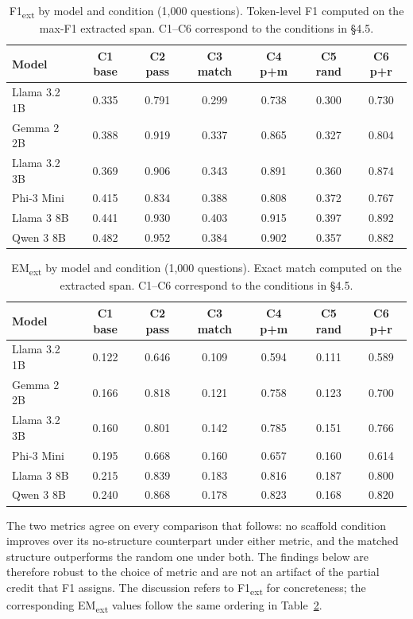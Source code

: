 \documentclass{article}
\begin{document}
\begin{table}[h]
\centering
\begin{tabular}{lcccccc}
\toprule
Model & C1 base & C2 pass & C3 match & C4 p+m & C5 rand & C6 p+r \\
\midrule
Llama 3.2 1B & 0.335 & 0.791 & 0.299 & 0.738 & 0.300 & 0.730 \\
Gemma 2 2B   & 0.388 & 0.919 & 0.337 & 0.865 & 0.327 & 0.804 \\
Llama 3.2 3B & 0.369 & 0.906 & 0.343 & 0.891 & 0.360 & 0.874 \\
Phi-3 Mini   & 0.415 & 0.834 & 0.388 & 0.808 & 0.372 & 0.767 \\
Llama 3 8B   & 0.441 & 0.930 & 0.403 & 0.915 & 0.397 & 0.892 \\
Qwen 3 8B    & 0.482 & 0.952 & 0.384 & 0.902 & 0.357 & 0.882 \\
\bottomrule
\end{tabular}
\caption{F1\textsubscript{ext} by model and condition (1,000 questions). Token-level F1 computed on the max-F1 extracted span. C1--C6 correspond to the conditions in \S4.5.}
\label{tab:f1ext}
\end{table}

\begin{table}[h]
\centering
\begin{tabular}{lcccccc}
\toprule
Model & C1 base & C2 pass & C3 match & C4 p+m & C5 rand & C6 p+r \\
\midrule
Llama 3.2 1B & 0.122 & 0.646 & 0.109 & 0.594 & 0.111 & 0.589 \\
Gemma 2 2B   & 0.166 & 0.818 & 0.121 & 0.758 & 0.123 & 0.700 \\
Llama 3.2 3B & 0.160 & 0.801 & 0.142 & 0.785 & 0.151 & 0.766 \\
Phi-3 Mini   & 0.195 & 0.668 & 0.160 & 0.657 & 0.160 & 0.614 \\
Llama 3 8B   & 0.215 & 0.839 & 0.183 & 0.816 & 0.187 & 0.800 \\
Qwen 3 8B    & 0.240 & 0.868 & 0.178 & 0.823 & 0.168 & 0.820 \\
\bottomrule
\end{tabular}
\caption{EM\textsubscript{ext} by model and condition (1,000 questions). Exact match computed on the extracted span. C1--C6 correspond to the conditions in \S4.5.}
\label{tab:emext}
\end{table}

The two metrics agree on every comparison that follows: no scaffold condition improves over its no-structure counterpart under either metric, and the matched structure outperforms the random one under both. The findings below are therefore robust to the choice of metric and are not an artifact of the partial credit that F1 assigns. The discussion refers to F1\textsubscript{ext} for concreteness; the corresponding EM\textsubscript{ext} values follow the same ordering in Table~\ref{tab:emext}.
\end{document}
